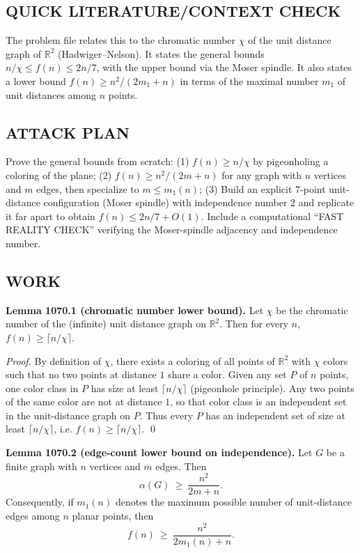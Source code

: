 \subsection*{QUICK LITERATURE/CONTEXT CHECK}
The problem file relates this to the chromatic number $\chi$ of the unit distance graph of $\mathbb{R}^2$ (Hadwiger--Nelson).  It states the general bounds $n/\chi\le f(n)\le 2n/7$, with the upper bound via the Moser spindle.  It also states a lower bound $f(n)\ge n^2/(2m_1+n)$ in terms of the maximal number $m_1$ of unit distances among $n$ points.

\subsection*{ATTACK PLAN}
Prove the general bounds from scratch:
(1) $f(n)\ge n/\chi$ by pigeonholing a coloring of the plane;
(2) $f(n)\ge n^2/(2m+n)$ for any graph with $n$ vertices and $m$ edges, then specialize to $m\le m_1(n)$;
(3) Build an explicit 7-point unit-distance configuration (Moser spindle) with independence number $2$ and replicate it far apart to obtain $f(n)\le 2n/7+O(1)$.
Include a computational ``FAST REALITY CHECK'' verifying the Moser-spindle adjacency and independence number.

\subsection*{WORK}
\textbf{Lemma 1070.1 (chromatic number lower bound).}
Let $\chi$ be the chromatic number of the (infinite) unit distance graph on $\mathbb{R}^2$.
Then for every $n$, $f(n)\ge \lceil n/\chi\rceil$.

\emph{Proof.}
By definition of $\chi$, there exists a coloring of all points of $\mathbb{R}^2$ with $\chi$ colors such that no two points at distance $1$ share a color.
Given any set $P$ of $n$ points, one color class in $P$ has size at least $\lceil n/\chi\rceil$ (pigeonhole principle). Any two points of the same color are not at distance $1$, so that color class is an independent set in the unit-distance graph on $P$.
Thus every $P$ has an independent set of size at least $\lceil n/\chi\rceil$, i.e. $f(n)\ge \lceil n/\chi\rceil$.
\qed

\textbf{Lemma 1070.2 (edge-count lower bound on independence).}
Let $G$ be a finite graph with $n$ vertices and $m$ edges. Then
\[
\alpha(G)\ \ge\ \frac{n^2}{2m+n}.
\]
Consequently, if $m_1(n)$ denotes the maximum possible number of unit-distance edges among $n$ planar points, then
\[
 f(n)\ \ge\ \frac{n^2}{2m_1(n)+n}.
\]

